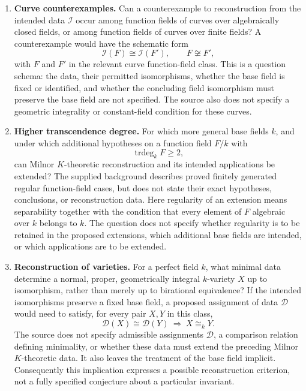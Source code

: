 \documentclass[11pt]{article}
\begin{document}
\begin{enumerate}
\item \textbf{Curve counterexamples.} Can a counterexample to reconstruction from the intended data \(\mathcal I\) occur among function fields of curves over algebraically closed fields, or among function fields of curves over finite fields? A counterexample would have the schematic form
\[
\mathcal I(F)\cong\mathcal I(F'),\qquad F\not\cong F',
\]
with \(F\) and \(F'\) in the relevant curve function-field class. This is a question schema: the data, their permitted isomorphisms, whether the base field is fixed or identified, and whether the concluding field isomorphism must preserve the base field are not specified. The source also does not specify a geometric integrality or constant-field condition for these curves.

\item \textbf{Higher transcendence degree.} For which more general base fields \(k\), and under which additional hypotheses on a function field \(F/k\) with
\[
\operatorname{trdeg}_k F\geq 2,
\]
can Milnor \(K\)-theoretic reconstruction and its intended applications be extended? The supplied background describes proved finitely generated regular function-field cases, but does not state their exact hypotheses, conclusions, or reconstruction data. Here regularity of an extension means separability together with the condition that every element of \(F\) algebraic over \(k\) belongs to \(k\). The question does not specify whether regularity is to be retained in the proposed extensions, which additional base fields are intended, or which applications are to be extended.

\item \textbf{Reconstruction of varieties.} For a perfect field \(k\), what minimal data determine a normal, proper, geometrically integral \(k\)-variety \(X\) up to isomorphism, rather than merely up to birational equivalence? If the intended isomorphisms preserve a fixed base field, a proposed assignment of data \(\mathcal D\) would need to satisfy, for every pair \(X,Y\) in this class,
\[
\mathcal D(X)\cong\mathcal D(Y)\ \Longrightarrow\ X\cong_k Y.
\]
The source does not specify admissible assignments \(\mathcal D\), a comparison relation defining minimality, or whether these data must extend the preceding Milnor \(K\)-theoretic data. It also leaves the treatment of the base field implicit. Consequently this implication expresses a possible reconstruction criterion, not a fully specified conjecture about a particular invariant.
\end{enumerate}
\end{document}
